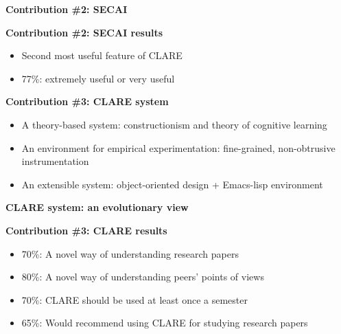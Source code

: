 \begin{slide} \Huge 
  {\bf Contribution \#2: SECAI}
  \horizontalline
  
  \centerline{}
\end{slide} \Huge


\begin{slide} \Huge 
  {\bf Contribution \#2: SECAI results}
  \horizontalline

  \begin{itemize}
  \item Second most useful feature of CLARE
    
  \item 77\%: extremely useful or very useful
  \end{itemize}
\end{slide} \Huge


\begin{slide} \Huge 
  {\bf Contribution \#3: CLARE system}
  \horizontalline
  \begin{itemize}
  \item A theory-based system: constructionism and theory of cognitive
    learning
    
  \item An environment for empirical experimentation: fine-grained,
    non-obtrusive instrumentation
    
  \item An extensible system: object-oriented design + Emacs-lisp
    environment
  \end{itemize}
\end{slide} \Huge


\begin{slide} \Huge 
  {\bf CLARE system: an evolutionary view}
  \horizontalline
  \bigskip

  \centerline{}
\end{slide} \Huge


\begin{slide} \Huge 
  {\bf Contribution \#3: CLARE results}
  \horizontalline

  \begin{itemize}
   \item 70\%: A novel way of understanding research papers
     
   \item 80\%: A novel way of understanding peers' points of views

   \item 70\%: CLARE should be used at least once a semester
     
   \item 65\%: Would recommend using CLARE for studying research
     papers
  \end{itemize}   
\end{slide} \Huge
   

